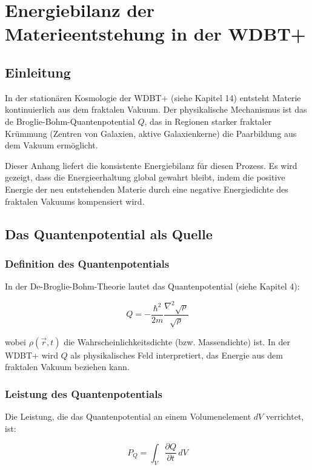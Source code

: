\chapter{Energiebilanz der Materieentstehung in der WDBT+}

\section{Einleitung}

In der stationären Kosmologie der WDBT+ (siehe Kapitel 14) entsteht Materie kontinuierlich 
aus dem fraktalen Vakuum. Der physikalische Mechanismus ist das de Broglie-Bohm-Quantenpotential
\( Q \), das in Regionen starker fraktaler Krümmung (Zentren von Galaxien, aktive Galaxienkerne) 
die Paarbildung aus dem Vakuum ermöglicht.

Dieser Anhang liefert die konsistente Energiebilanz für diesen Prozess. Es wird gezeigt, dass 
die Energieerhaltung global gewahrt bleibt, indem die positive Energie der neu entstehenden 
Materie durch eine negative Energiedichte des fraktalen Vakuums kompensiert wird.

\section{Das Quantenpotential als Quelle}

\subsection{Definition des Quantenpotentials}

In der De-Broglie-Bohm-Theorie lautet das Quantenpotential (siehe Kapitel 4):

\[
Q = -\frac{\hbar^2}{2m} \frac{\nabla^2 \sqrt{\rho}}{\sqrt{\rho}}
\]

wobei \( \rho(\vec{r}, t) \) die Wahrscheinlichkeitsdichte (bzw. Massendichte) ist. 
In der WDBT+ wird \( Q \) als physikalisches Feld interpretiert, das Energie aus dem 
fraktalen Vakuum beziehen kann.

\subsection{Leistung des Quantenpotentials}

Die Leistung, die das Quantenpotential an einem Volumenelement \( dV \) verrichtet, ist:

\[
P_Q = \int_V \frac{\partial Q}{\partial t} \, dV
\]

